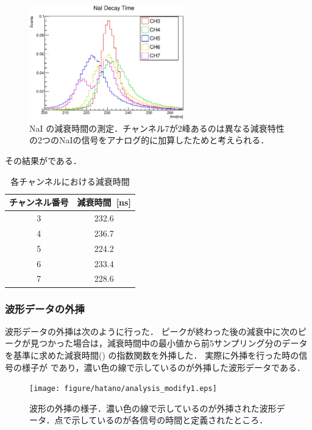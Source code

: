 \begin{figure}[hbt]
\centering
\includegraphics[width=0.6\textwidth]{figure/hatano/decaytime.eps}
\caption{NaI の減衰時間の測定．チャンネル7が2峰あるのは異なる減衰特性の2つのNaIの信号をアナログ的に加算したためと考えられる．}
\label{hatano_fig:decaytime}
\end{figure}

その結果がである．

\begin{table}[hbt]
\centering
\caption{各チャンネルにおける減衰時間}
\begin{tabular}{cc}\\ \toprule
チャンネル番号 & 減衰時間~[ns]\\ \midrule
3 & 232.6 \\
4 & 236.7 \\
5 & 224.2 \\
6 & 233.4 \\
7 & 228.6 \\ \bottomrule
\end{tabular}
\label{hatano_tab:decaytime}
\end{table}

\subsubsection{波形データの外挿}
波形データの外挿は次のように行った．
ピークが終わった後の減衰中に次のピークが見つかった場合は，減衰時間中の最小値から前5サンプリング分のデータを基準に求めた減衰時間() の指数関数を外挿した．
実際に外挿を行った時の信号の様子が であり，濃い色の線で示しているのが外挿した波形データである．

\begin{figure}[hbt]
\centering
\texttt{[image: figure/hatano/analysis\_modify1.eps]}
\caption{波形の外挿の様子．濃い色の線で示しているのが外挿された波形データ．点で示しているのが各信号の時間と定義されたところ．}
\label{hatano_fig:analysis}
\end{figure}

